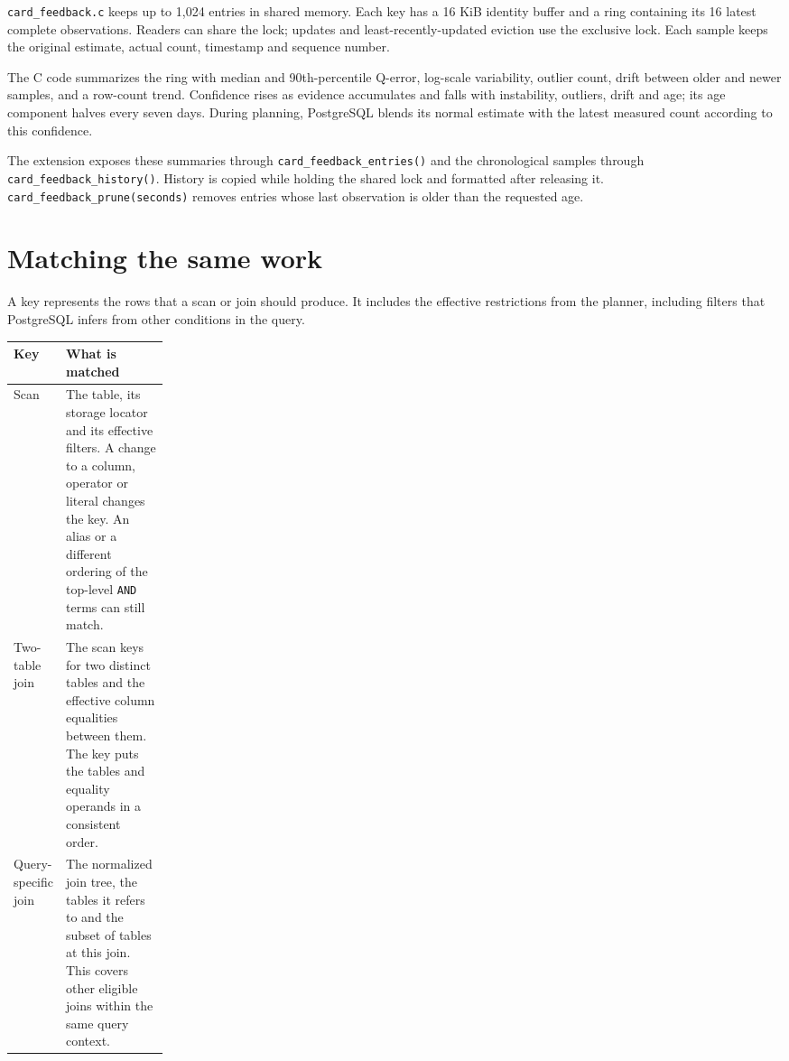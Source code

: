 \documentclass[11pt,a4paper]{article}
\begin{document}
\texttt{card\_feedback.c} keeps up to 1,024 entries in shared memory. Each
key has a 16 KiB identity buffer and a ring containing its 16 latest complete
observations. Readers can share the lock; updates and least-recently-updated
eviction use the exclusive lock. Each sample keeps the original estimate,
actual count, timestamp and sequence number.

The C code summarizes the ring with median and 90th-percentile Q-error,
log-scale variability, outlier count, drift between older and newer samples,
and a row-count trend. Confidence rises as evidence accumulates and falls
with instability, outliers, drift and age; its age component halves every
seven days. During planning, PostgreSQL blends its normal estimate with the
latest measured count according to this confidence.

The extension exposes these summaries through
\texttt{card\_feedback\_entries()} and the chronological samples through
\texttt{card\_feedback\_history()}. History is copied while holding the shared
lock and formatted after releasing it. \texttt{card\_feedback\_prune(seconds)}
removes entries whose last observation is older than the requested age.

\section*{Matching the same work}
A key represents the rows that a scan or join should produce. It includes the
effective restrictions from the planner, including filters that PostgreSQL
infers from other conditions in the query.

\begin{tabularx}{\linewidth}{@{}p{0.20\linewidth}X@{}}
\toprule
\textbf{Key} & \textbf{What is matched} \\
\midrule
Scan & The table, its storage locator and its effective filters. A change to
a column, operator or literal changes the key. An alias or a different
ordering of the top-level \texttt{AND} terms can still match. \\
\addlinespace
Two-table join & The scan keys for two distinct tables and the effective
column equalities between them. The key puts the tables and equality
operands in a consistent order. \\
\addlinespace
Query-specific join & The normalized join tree, the tables it refers to and
the subset of tables at this join. This covers other eligible joins within
the same query context. \\
\bottomrule
\end{tabularx}
\end{document}
